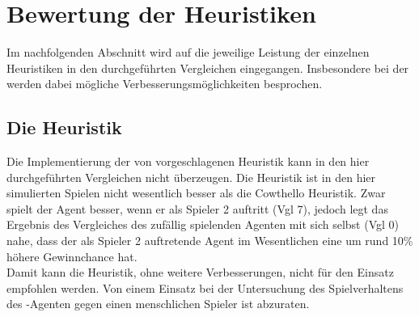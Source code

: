 \section{Bewertung der Heuristiken}
\label{sect:Fazit:Heuristiken}
Im nachfolgenden Abschnitt wird auf die jeweilige Leistung der einzelnen Heuristiken in den durchgeführten Vergleichen eingegangen. Insbesondere bei der  werden dabei mögliche Verbesserungsmöglichkeiten besprochen.  
\subsection{Die Heuristik }
Die Implementierung der von \cite{nijssen_2007} vorgeschlagenen Heuristik kann in den hier durchgeführten Vergleichen nicht überzeugen. Die Heuristik ist in den hier simulierten Spielen nicht wesentlich besser als die Cowthello Heuristik. Zwar spielt der Agent besser, wenn er als Spieler 2 auftritt (\ac{Vgl} 7), jedoch legt das Ergebnis des Vergleiches des zufällig spielenden Agenten mit sich selbst (\ac{Vgl} 0) nahe, dass der als Spieler 2 auftretende Agent im Wesentlichen eine um rund 10\% höhere Gewinnchance hat.
\\Damit kann die Heuristik, ohne weitere Verbesserungen, nicht für den Einsatz empfohlen werden. Von einem Einsatz bei der Untersuchung des Spielverhaltens des \mxZitat{\abp}-Agenten gegen einen menschlichen Spieler ist abzuraten. 
